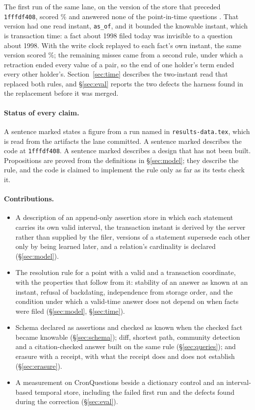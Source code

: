 The first run of the same lane, on the version of the store that preceded
\texttt{1fffdf408}, scored \% and answered none of the
 point-in-time questions \meas{}. That version had one read
instant, \texttt{as\_of}, and it bounded the knowable instant, which is
transaction time: a fact about 1998 filed today was invisible to a question
about 1998. With the write clock replayed to each fact's own instant, the same
version scored \%; the remaining misses came from a
second rule, under which a retraction ended every value of a pair, so the end of
one holder's term ended every other holder's. Section~\ref{sec:time} describes
the two-instant read that replaced both rules, and \S\ref{sec:eval} reports
the two defects the harness found in the replacement before it was merged.

\paragraph{Status of every claim.}
A sentence marked \meas{} states a figure from a run named in
\texttt{results-data.tex}, which is read from the artifacts the lane committed.
A sentence marked \shipped{} describes the code at \texttt{1fffdf408}. A sentence
marked \proposed{} describes a design that has not been built. Propositions are
proved from the definitions in \S\ref{sec:model}; they describe the rule, and
the code is claimed to implement the rule only as far as its tests check it.

\paragraph{Contributions.}
\begin{itemize}[leftmargin=*]
\item A description of an append-only assertion store in which each statement
  carries its own valid interval, the transaction instant is derived by the
  server rather than supplied by the filer, versions of a statement supersede
  each other only by being learned later, and a relation's cardinality is
  declared (\S\ref{sec:model}).
\item The resolution rule for a point with a valid and a transaction
  coordinate, with the properties that follow from it: stability of an answer
  as known at an instant, refusal of backdating, independence from storage
  order, and the condition under which a valid-time answer does not depend on
  when facts were filed (\S\ref{sec:model}, \S\ref{sec:time}).
\item Schema declared as assertions and checked as known when the checked fact
  became knowable (\S\ref{sec:schema}); diff, shortest path, community detection
  and a citation-checked answer built on the same rule (\S\ref{sec:queries}); and
  erasure with a receipt, with what the receipt does and does not establish
  (\S\ref{sec:erasure}).
\item A measurement on CronQuestions beside a dictionary control and an
  interval-based temporal store, including the failed first run and the defects
  found during the correction (\S\ref{sec:eval}).
\end{itemize}
